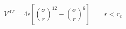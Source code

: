 \pagestyle{empty}



$$
 V^{AT} = 4 \epsilon \left[ \left(\frac{\sigma}{r}\right)^{12} - 
                       \left(\frac{\sigma}{r}\right)^6 \right]
                       \qquad r < r_c
$$


